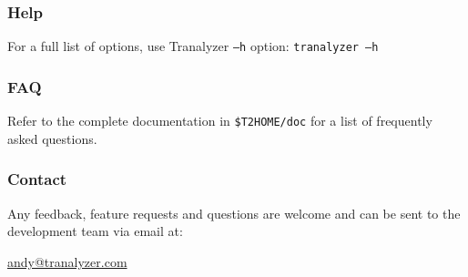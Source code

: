 \subsubsection{Help}
For a full list of options, use Tranalyzer {\tt --h} option: {\tt tranalyzer --h}

\subsubsection{FAQ}
Refer to the complete documentation in {\tt \$T2HOME/doc} for a list of frequently asked questions.

\subsubsection{Contact}
Any feedback, feature requests and questions are welcome and can be sent to the development team via email at:
\begin{center}\href{mailto:andy@tranalyzer.com}{andy@tranalyzer.com}\end{center}
